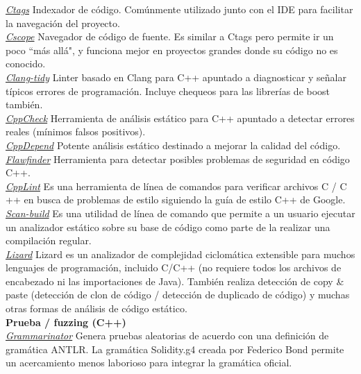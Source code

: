 \underline{\textit{Ctags}}
Indexador de código. Comúnmente utilizado junto con el IDE para facilitar la navegación del proyecto.\\

\underline{\textit{Cscope}}
Navegador de código de fuente. Es similar a Ctags pero permite ir un poco ``más allá", y funciona mejor en proyectos grandes donde su código no es conocido.\\

\underline{\textit{Clang-tidy}}
Linter basado en Clang para C++ apuntado a diagnosticar y señalar típicos errores de programación. Incluye chequeos para las librerías de boost también.\\

\underline{\textit{CppCheck}}
Herramienta de análisis estático para C++ apuntado a detectar errores reales (mínimos falsos positivos).\\

\underline{\textit{CppDepend}}
Potente análisis estático destinado a mejorar la calidad del código.\\

\underline{\textit{Flawfinder}}
Herramienta para detectar posibles problemas de seguridad en código C++.\\

\underline{\textit{CppLint}}
Es una herramienta de línea de comandos para verificar archivos C / C ++ en busca de problemas de estilo siguiendo la guía de estilo C++ de Google.\\

\underline{\textit{Scan-build}}
Es una utilidad de línea de comando que permite a un usuario ejecutar un analizador estático sobre su base de código como parte de la realizar una compilación regular.\\

\underline{\textit{Lizard}}
Lizard es un analizador de complejidad ciclomática extensible para muchos lenguajes de programación, incluido C/C++ (no requiere todos los archivos de encabezado ni las importaciones de Java). También realiza detección de copy \& paste (detección de clon de código / detección de duplicado de código) y muchas otras formas de análisis de código estático.\\

\textbf{Prueba / fuzzing (C++)}\\

\underline{\textit{Grammarinator}}
Genera pruebas aleatorias de acuerdo con una definición de gramática ANTLR. La gramática Solidity.g4 creada por Federico Bond permite un acercamiento menos laborioso para integrar la gramática oficial.\\

